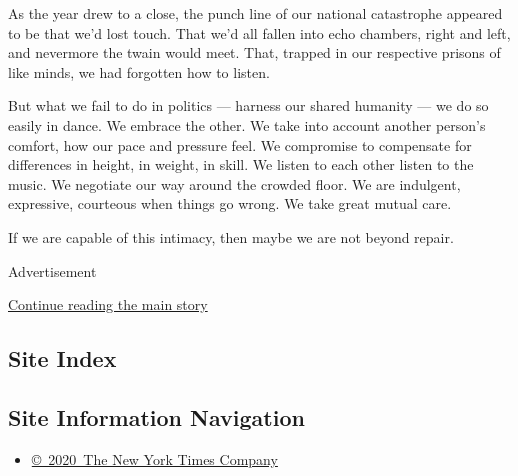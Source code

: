 As the year drew to a close, the punch line of our national catastrophe
appeared to be that we'd lost touch. That we'd all fallen into echo
chambers, right and left, and nevermore the twain would meet. That,
trapped in our respective prisons of like minds, we had forgotten how to
listen.

But what we fail to do in politics --- harness our shared humanity ---
we do so easily in dance. We embrace the other. We take into account
another person's comfort, how our pace and pressure feel. We compromise
to compensate for differences in height, in weight, in skill. We listen
to each other listen to the music. We negotiate our way around the
crowded floor. We are indulgent, expressive, courteous when things go
wrong. We take great mutual care.

If we are capable of this intimacy, then maybe we are not beyond repair.

Advertisement

\protect\hyperlink{after-bottom}{Continue reading the main story}

\hypertarget{site-index}{%
\subsection{Site Index}\label{site-index}}

\hypertarget{site-information-navigation}{%
\subsection{Site Information
Navigation}\label{site-information-navigation}}

\begin{itemize}
\tightlist
\item
  \href{https://help.nytimes.com/hc/en-us/articles/115014792127-Copyright-notice}{©~2020~The
  New York Times Company}
\end{itemize}

